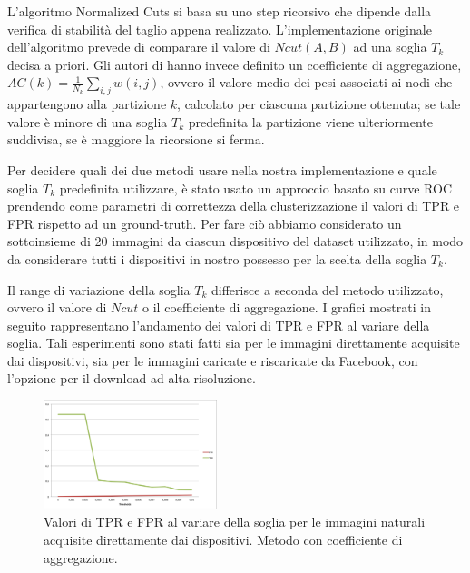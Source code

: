 L'algoritmo Normalized Cuts si basa su uno step ricorsivo che dipende dalla verifica di stabilità del taglio appena realizzato. L'implementazione originale dell'algoritmo prevede di comparare il valore di $Ncut(A,B)$ ad una soglia $T_{k}$ decisa a priori. Gli autori di \cite{ Amerini2014831} hanno invece definito un coefficiente di aggregazione, $AC(k) = \frac{1}{N_{k}} \sum_{i,j} w(i,j)$, ovvero il valore medio dei pesi associati ai nodi che appartengono alla partizione $k$, calcolato per ciascuna partizione ottenuta; se tale valore è minore di una soglia $T_{k}$ predefinita la partizione viene ulteriormente suddivisa, se è maggiore la ricorsione si ferma.

Per decidere quali dei due metodi usare nella nostra implementazione e quale soglia $T_{k}$ predefinita utilizzare, è stato usato un approccio basato su curve ROC prendendo come parametri di correttezza della clusterizzazione il valori di TPR e FPR rispetto ad un ground-truth. Per fare ciò abbiamo considerato un sottoinsieme di 20 immagini da ciascun dispositivo del dataset utilizzato, in modo da considerare tutti i dispositivi in nostro possesso per la scelta della soglia $T_{k}$.

Il range di variazione della soglia $T_{k}$ differisce a seconda del metodo utilizzato, ovvero il valore di $Ncut$ o il coefficiente di aggregazione. I grafici mostrati in seguito rappresentano l'andamento dei valori di TPR e FPR al variare della soglia. Tali esperimenti sono stati fatti sia per le immagini direttamente acquisite dai dispositivi, sia per le immagini caricate e riscaricate da Facebook, con l'opzione per il download ad alta risoluzione.

\begin{figure}[h]
\begin{center}
\includegraphics[width=0.45\textwidth]{images/soglia_imgnat_AC.png}
\end{center}
  \caption{Valori di TPR e FPR al variare della soglia per le immagini naturali acquisite direttamente dai dispositivi. Metodo con coefficiente di aggregazione.}
\label{fig:soglia AC}
\end{figure}

